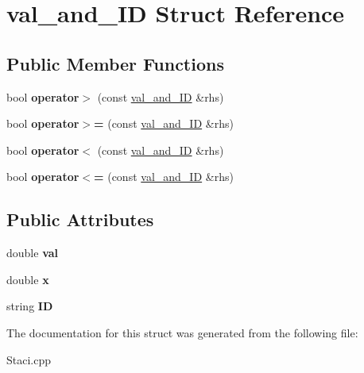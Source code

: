 \hypertarget{structval__and___i_d}{}\section{val\+\_\+and\+\_\+\+ID Struct Reference}
\label{structval__and___i_d}
\subsection*{Public Member Functions}
\begin{DoxyCompactItemize}
\item 
\mbox{\label{structval__and___i_d_ad0383ea848597116b42d5bdb30af6a81}} 
bool {\bfseries operator$>$} (const \hyperlink{structval__and___i_d}{val\+\_\+and\+\_\+\+ID} \&rhs)
\item 
\mbox{\label{structval__and___i_d_a611b66160944af29387d4d6922456aee}} 
bool {\bfseries operator$>$=} (const \hyperlink{structval__and___i_d}{val\+\_\+and\+\_\+\+ID} \&rhs)
\item 
\mbox{\label{structval__and___i_d_ae2e4f546eb06d0876c7d0a6586b16023}} 
bool {\bfseries operator$<$} (const \hyperlink{structval__and___i_d}{val\+\_\+and\+\_\+\+ID} \&rhs)
\item 
\mbox{\label{structval__and___i_d_a5fbe6c94dd69624d5d44049bca3641a7}} 
bool {\bfseries operator$<$=} (const \hyperlink{structval__and___i_d}{val\+\_\+and\+\_\+\+ID} \&rhs)
\end{DoxyCompactItemize}
\subsection*{Public Attributes}
\begin{DoxyCompactItemize}
\item 
\mbox{\label{structval__and___i_d_a913f0c89fd3a08a6949e4e2972e0ebdf}} 
double {\bfseries val}
\item 
\mbox{\label{structval__and___i_d_a6bd346f024471ca29a947a17da0a124b}} 
double {\bfseries x}
\item 
\mbox{\label{structval__and___i_d_a571722e308538df013c87cdd67a4ff87}} 
string {\bfseries ID}
\end{DoxyCompactItemize}


The documentation for this struct was generated from the following file\+:\begin{DoxyCompactItemize}
\item 
Staci.\+cpp\end{DoxyCompactItemize}
